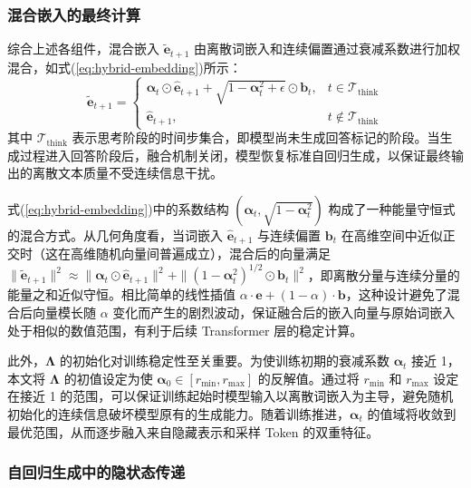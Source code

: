 \subsubsection{混合嵌入的最终计算}

综合上述各组件，混合嵌入 $\tilde{\mathbf{e}}_{t+1}$ 由离散词嵌入和连续偏置通过衰减系数进行加权混合，如式(\ref{eq:hybrid-embedding})所示：
\begin{equation}\label{eq:hybrid-embedding}
  \tilde{\mathbf{e}}_{t+1} =
  \begin{cases}
    \boldsymbol{\alpha}_t \odot \hat{\mathbf{e}}_{t+1} + \sqrt{1 - \boldsymbol{\alpha}_t^2 + \epsilon} \odot \mathbf{b}_t, & t \in \mathcal{T}_{\text{think}} \\
    \hat{\mathbf{e}}_{t+1}, & t \notin \mathcal{T}_{\text{think}}
  \end{cases}
\end{equation}
其中 $\mathcal{T}_{\text{think}}$ 表示思考阶段的时间步集合，即模型尚未生成回答标记的阶段。当生成过程进入回答阶段后，融合机制关闭，模型恢复标准自回归生成，以保证最终输出的离散文本质量不受连续信息干扰。

式(\ref{eq:hybrid-embedding})中的系数结构 $(\boldsymbol{\alpha}_t, \sqrt{1-\boldsymbol{\alpha}_t^2})$ 构成了一种能量守恒式的混合方式。从几何角度看，当词嵌入 $\hat{\mathbf{e}}_{t+1}$ 与连续偏置 $\mathbf{b}_t$ 在高维空间中近似正交时（这在高维随机向量间普遍成立），混合后的向量满足 $\|\tilde{\mathbf{e}}_{t+1}\|^2 \approx \|\boldsymbol{\alpha}_t \odot \hat{\mathbf{e}}_{t+1}\|^2 + \|(1-\boldsymbol{\alpha}_t^2)^{1/2} \odot \mathbf{b}_t\|^2$，即离散分量与连续分量的能量之和近似守恒。相比简单的线性插值 $\alpha \cdot \mathbf{e} + (1-\alpha) \cdot \mathbf{b}$，这种设计避免了混合后向量模长随 $\alpha$ 变化而产生的剧烈波动，保证融合后的嵌入向量与原始词嵌入处于相似的数值范围，有利于后续 Transformer 层的稳定计算。

此外，$\boldsymbol{\Lambda}$ 的初始化对训练稳定性至关重要。为使训练初期的衰减系数 $\boldsymbol{\alpha}_t$ 接近 1，本文将 $\boldsymbol{\Lambda}$ 的初值设定为使 $\boldsymbol{\alpha}_0 \in [r_{\min}, r_{\max}]$ 的反解值。通过将 $r_{\min}$ 和 $r_{\max}$ 设定在接近 1 的范围，可以保证训练起始时模型输入以离散词嵌入为主导，避免随机初始化的连续信息破坏模型原有的生成能力。随着训练推进，$\boldsymbol{\alpha}_t$ 的值域将收敛到最优范围，从而逐步融入来自隐藏表示和采样 Token 的双重特征。

\subsubsection{自回归生成中的隐状态传递}

